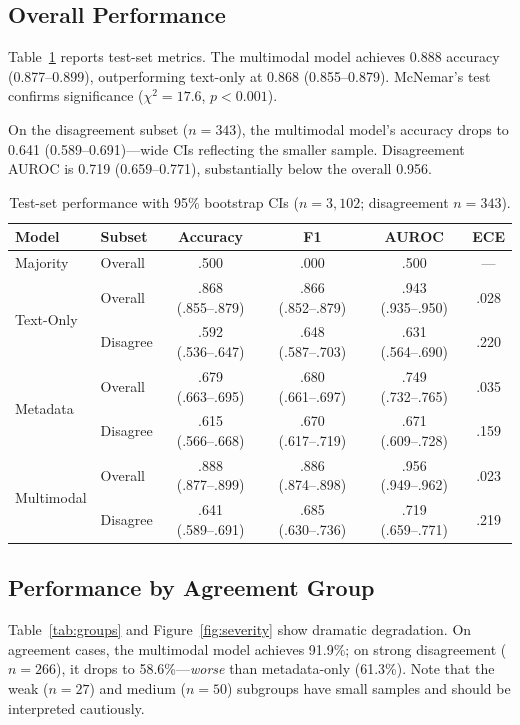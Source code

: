 \documentclass[11pt,a4paper]{article}
\begin{document}
\subsection{Overall Performance}

Table~\ref{tab:main} reports test-set metrics.
The multimodal model achieves 0.888 accuracy (0.877--0.899), outperforming text-only at 0.868 (0.855--0.879).
McNemar's test confirms significance ($\chi^2 = 17.6$, $p < 0.001$).

On the disagreement subset ($n = 343$), the multimodal model's accuracy drops to 0.641 (0.589--0.691)---wide CIs reflecting the smaller sample.
Disagreement AUROC is 0.719 (0.659--0.771), substantially below the overall 0.956.

\begin{table}[htbp]
\centering
\small
\caption{Test-set performance with 95\% bootstrap CIs ($n = 3{,}102$; disagreement $n = 343$).}
\label{tab:main}
\begin{tabular}{llcccc}
\toprule
\textbf{Model} & \textbf{Subset} & \textbf{Accuracy} & \textbf{F1} & \textbf{AUROC} & \textbf{ECE} \\
\midrule
Majority & Overall & .500 & .000 & .500 & --- \\
\midrule
\multirow{2}{*}{Text-Only} & Overall & .868 (.855--.879) & .866 (.852--.879) & .943 (.935--.950) & .028 \\
 & Disagree & .592 (.536--.647) & .648 (.587--.703) & .631 (.564--.690) & .220 \\
\midrule
\multirow{2}{*}{Metadata} & Overall & .679 (.663--.695) & .680 (.661--.697) & .749 (.732--.765) & .035 \\
 & Disagree & .615 (.566--.668) & .670 (.617--.719) & .671 (.609--.728) & .159 \\
\midrule
\multirow{2}{*}{Multimodal} & Overall & .888 (.877--.899) & .886 (.874--.898) & .956 (.949--.962) & .023 \\
 & Disagree & .641 (.589--.691) & .685 (.630--.736) & .719 (.659--.771) & .219 \\
\bottomrule
\end{tabular}
\end{table}

\subsection{Performance by Agreement Group}

Table~\ref{tab:groups} and Figure~\ref{fig:severity} show dramatic degradation.
On agreement cases, the multimodal model achieves 91.9\%; on strong disagreement ($n = 266$), it drops to 58.6\%---\emph{worse} than metadata-only (61.3\%).
Note that the weak ($n = 27$) and medium ($n = 50$) subgroups have small samples and should be interpreted cautiously.
\end{document}
